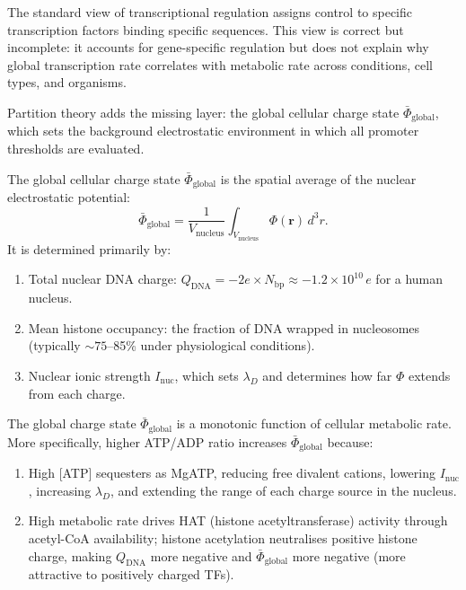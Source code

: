 The standard view of transcriptional regulation assigns control to specific
transcription factors binding specific sequences. This view is correct but
incomplete: it accounts for gene-specific regulation but does not explain
why global transcription rate correlates with metabolic rate across conditions,
cell types, and organisms.

Partition theory adds the missing layer: the global cellular charge state
$\bar\Phi_{\mathrm{global}}$, which sets the background electrostatic
environment in which all promoter thresholds are evaluated.

\begin{definition}
\label{def:global_charge}
The global cellular charge state $\bar\Phi_{\mathrm{global}}$ is the
spatial average of the nuclear electrostatic potential:
\begin{equation}
  \bar\Phi_{\mathrm{global}} = \frac{1}{V_{\mathrm{nucleus}}}
  \int_{V_{\mathrm{nucleus}}} \Phi(\mathbf{r})\,d^3r.
  \label{eq:global_charge}
\end{equation}
It is determined primarily by:
\begin{enumerate}[label=(\roman*)]
  \item Total nuclear DNA charge: $Q_{\mathrm{DNA}} = -2e \times N_{\mathrm{bp}}
        \approx -1.2 \times 10^{10}\,e$ for a human nucleus.
  \item Mean histone occupancy: the fraction of DNA wrapped in nucleosomes
        (typically $\sim 75$--85\% under physiological conditions).
  \item Nuclear ionic strength $I_{\mathrm{nuc}}$, which sets $\lambda_D$
        and determines how far $\Phi$ extends from each charge.
\end{enumerate}
\end{definition}

\begin{proposition}
\label{prop:metabolic_charge}
The global charge state $\bar\Phi_{\mathrm{global}}$ is a monotonic function
of cellular metabolic rate. More specifically, higher ATP/ADP ratio increases
$\bar\Phi_{\mathrm{global}}$ because:
\begin{enumerate}[label=(\roman*)]
  \item High [ATP] sequesters  as MgATP, reducing free divalent
        cations, lowering $I_{\mathrm{nuc}}$, increasing $\lambda_D$, and
        extending the range of each charge source in the nucleus.
  \item High metabolic rate drives HAT (histone acetyltransferase) activity
        through acetyl-CoA availability; histone acetylation neutralises
        positive histone charge, making $Q_{\mathrm{DNA}}$ more negative and
        $\bar\Phi_{\mathrm{global}}$ more negative (more attractive to
        positively charged TFs).
\end{enumerate}
\end{proposition}

